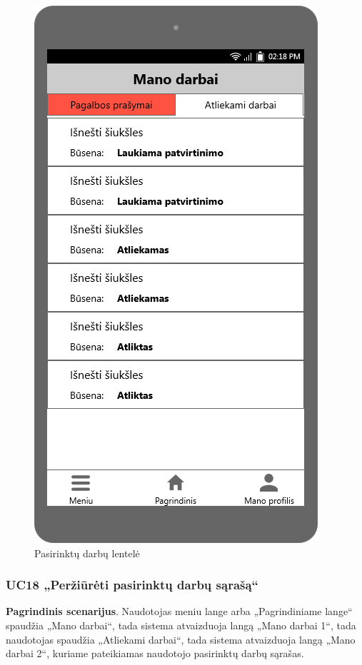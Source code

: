 \documentclass{VUMIFPSbakalaurinis}
\begin{document}
\begin{figure}[H]
	\centering
	\includegraphics[scale=0.4]{img/ScreenShots/06-Mano-darbai2}
	\caption{Pasirinktų darbų lentelė}
	\label{img:selected jobs table}
\end{figure}
\subsubsection{UC18 „Peržiūrėti pasirinktų darbų sąrašą“}
\textbf{Pagrindinis scenarijus}. Naudotojas meniu lange arba „Pagrindiniame lange“ spaudžia „Mano darbai“, tada sistema atvaizduoja langą „Mano darbai 1“, tada naudotojas spaudžia „Atliekami darbai“, tada sistema atvaizduoja langą „Mano darbai 2“, kuriame pateikiamas naudotojo pasirinktų darbų sąrašas.
\end{document}
